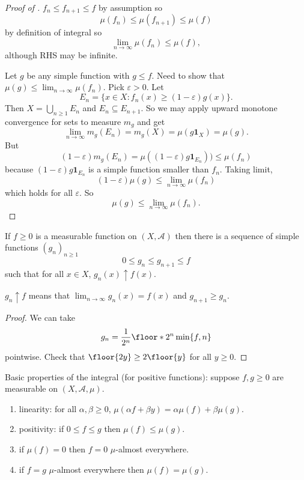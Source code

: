 \documentclass[a4paper]{article}
\begin{document}
\begin{proof}[Proof of ]
  \(f_n \leq f_{n + 1} \leq f\) by assumption so
  \[
    \mu(f_n) \leq \mu(f_{n + 1}) \leq \mu(f)
  \]
  by definition of integral so
  \[
    \lim_{n \to \infty} \mu(f_n) \leq \mu(f),
  \]
  although RHS may be infinite.

  Let \(g\) be any simple function with \(g \leq f\). Need to show that \(\mu(g) \leq \lim_{n \to \infty} \mu(f_n)\). Pick \(\varepsilon > 0\). Let
  \[
    E_n = \{x \in X: f_n(x) \geq (1 - \varepsilon) g(x) \}.
  \]
  Then \(X = \bigcup_{n \geq 1} E_n\) and \(E_n \subseteq E_{n + 1}\). So we may apply upward monotone convergence for sets to measure \(m_g\) and get
  \[
    \lim_{n \to \infty} m_g(E_n) = m_g(X) = \mu(g \mathbf 1_X) = \mu(g).
  \]
  But
  \[
    (1 - \varepsilon) m_g(E_n) = \mu((1 - \varepsilon) g \mathbf 1_{E_n})) \leq \mu(f_n)
  \]
  because \((1 - \varepsilon) g \mathbf 1_{E_n}\) is a simple function smaller than \(f_n\). Taking limit,
  \[
    (1 - \varepsilon) \mu(g) \leq \lim_{n \to \infty} \mu(f_n)
  \]
  which holds for all \(\varepsilon\). So
  \[
    \mu(g) \leq \lim_{n \to \infty} \mu(f_n).
  \]
\end{proof}

\begin{lemma}
  \label{lem:approximation by simple functions}
  If \(f \geq 0\) is a measurable function on \((X, \mathcal A)\) then there is a sequence of simple functions \((g_n)_{n \geq 1}\)
  \[
    0 \leq g_n \leq g_{n + 1} \leq f
  \]
  such that for all \(x \in X\), \(g_n(x) \uparrow f(x)\).
\end{lemma}

\begin{notation}
  \(g_n \uparrow f\) means that \(\lim_{n \to \infty} g_n(x) = f(x)\) and \(g_{n + 1} \geq g_n\).
\end{notation}

\begin{proof}
  We can take
  \[
    g_n = \frac{1}{2^n} \floor*{2^n \min \{f, n\}}
  \]
  pointwise. Check that \(\floor{2y} \geq 2 \floor{y}\) for all \(y \geq 0\).
\end{proof}

\begin{proposition}
  Basic properties of the integral (for positive functions): suppose \(f, g \geq 0\) are measurable on \((X, \mathcal A, \mu)\).
  \begin{enumerate}
  \item linearity: for all \(\alpha, \beta \geq 0\), \(\mu(\alpha f + \beta y) = \alpha \mu(f) + \beta \mu(g)\).
  \item positivity: if \(0 \leq f \leq g\) then \(\mu(f) \leq \mu(g)\).
  \item if \(\mu(f) = 0\) then \(f = 0\) \(\mu\)-almost everywhere.
  \item if \(f = g\) \(\mu\)-almost everywhere then \(\mu(f) = \mu(g)\).
  \end{enumerate}
\end{proposition}
\end{document}
